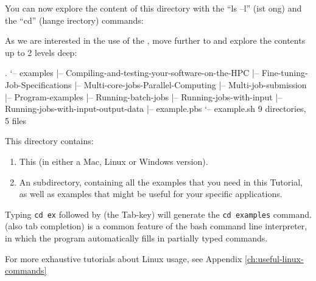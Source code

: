 You can now explore the content of this directory with the ``ls --l''
(ist ong) and the ``cd'' (hange
irectory) commands:

As we are interested in the use of the , move further to
 and explore the contents up to 2 levels deep:

\begin{prompt}
.
`-- examples
    |-- Compiling-and-testing-your-software-on-the-HPC
    |-- Fine-tuning-Job-Specifications
    |-- Multi-core-jobs-Parallel-Computing
    |-- Multi-job-submission
    |-- Program-examples
    |-- Running-batch-jobs
    |-- Running-jobs-with-input
    |-- Running-jobs-with-input-output-data
    |-- example.pbs
    `-- example.sh
9 directories, 5 files
\end{prompt}

This directory contains:

\begin{enumerate}
  \item This  (in either a Mac, Linux or Windows version).
  \item An  subdirectory, containing all the
    examples that you need in this Tutorial, as well as examples that might be
    useful for your specific applications.
\end{enumerate}

\begin{prompt}
\end{prompt}

\begin{tip}
Typing \lstinline|cd ex| followed by \keys{\tab} (the Tab-key) will generate the
\lstinline|cd examples| command. (also tab completion) is a common feature of the bash command line
interpreter, in which the program automatically fills in partially typed
commands.
\end{tip}

\begin{tip}
For more exhaustive tutorials about Linux usage, see Appendix \ref{ch:useful-linux-commands}
\end{tip}

